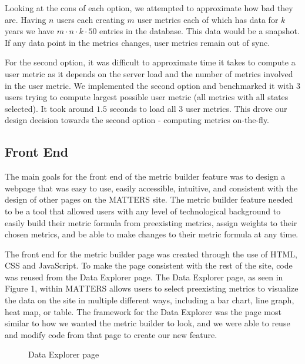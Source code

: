 			Looking at the cons of each option, we attempted to approximate how bad they are.
			Having $n$ users each creating $m$ user metrics each of which has data for $k$ years
			we have $m \cdot n \cdot k \cdot 50$ entries in the database.
			This data would be a snapshot. If any data point in the metrics changes, user metrics remain out of sync.

			For the second option, it was difficult to approximate time it takes to compute a user metric 
			as it depends on the server load and the number of metrics involved in the user metric. 
			We implemented the second option and benchmarked it with $3$ users trying to compute 
			largest possible user metric (all metrics with all states selected). 
			It took around $1.5$ seconds to load all $3$ user metrics. 
			This drove our design decision towards the second option - computing metrics on-the-fly.

		\subsection{Front End}
		
			The main goals for the front end of the metric builder feature was to design a webpage 
			that was easy to use, easily accessible, intuitive, and consistent 
			with the design of other pages on the MATTERS site. 
			The metric builder feature needed to be a tool that allowed users with any level of 
			technological background to easily build their metric formula from preexisting metrics, 
			assign weights to their chosen metrics, and be able to make changes to their metric formula at any time.
			
			The front end for the metric builder page was created through the use of HTML, CSS and JavaScript. 
			To make the page consistent with the rest of the site, code was reused from the Data Explorer page. 
			The Data Explorer page, as seen in Figure 1, within MATTERS allows users to select 
			preexisting metrics to visualize the data on the site in multiple different ways, 
			including a bar chart, line graph, heat map, or table. The framework for the 
			Data Explorer was the page most similar to how we wanted the metric builder to look, 
			and we were able to reuse and modify code from that page to create our new feature. 
			
			\begin{figure}[t]
				\centering
					\caption{Data Explorer page}
				\label{fig:dataexplorer}
			\end{figure}
			
